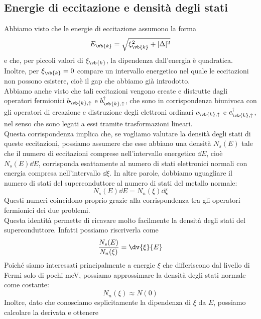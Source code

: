 \subsection{Energie di eccitazione e densità degli stati}
Abbiamo visto che le energie di eccitazione assumono la forma
\begin{equation*}
   E_{\vb{k}}
   =
   \sqrt{
      \xi_{\vb{k}}^2
      +
      |\Delta|^2
   }
\end{equation*}
e che, per piccoli valori di $\xi_{\vb{k}}$, la dipendenza dall'energia è quadratica. Inoltre, per $\xi_{\vb{k}}=0$ compare un intervallo energetico nel quale le eccitazioni non possono esistere, cioè il gap che abbiamo già introdotto.\\
Abbiamo anche visto che tali eccitazioni vengono create e distrutte dagli operatori fermionici $b_{\vb{k},\uparrow}$ e $b^{\dag}_{\vb{k},\uparrow}$, che sono in corrispondenza biunivoca con gli operatori di creazione e distruzione degli elettroni ordinari $c_{\vb{k},\uparrow}$ e $c^{\dag}_{\vb{k},\uparrow}$, nel senso che sono legati a essi tramite trasformazioni lineari.\\
Questa corrispondenza implica che, se vogliamo valutare la densità degli stati di queste eccitazioni, possiamo assumere che esse abbiano una densità $N_s(E)$ tale che il numero di eccitazioni comprese nell'intervallo energetico $\dd{E}$, cioè $N_s(E)\dd{E}$, corrisponda esattamente al numero di stati elettronici normali con energia compresa nell'intervallo $\dd{\xi}$. In altre parole, dobbiamo uguagliare il numero di stati del superconduttore al numero di stati del metallo normale:
\begin{equation*}
   N_s(E)\dd{E}=N_n(\xi)\dd{\xi}
\end{equation*}
Questi numeri coincidono proprio grazie alla corrispondenza tra gli operatori fermionici dei due problemi.\\
Questa identità permette di ricavare molto facilmente la densità degli stati del superconduttore. Infatti possiamo riscriverla come
\begin{equation*}
   \frac{ N_s(E) }{
      N_n(\xi)
   }
   =
   \dv{\xi}{E}
\end{equation*}
Poiché siamo interessati principalmente a energie $\xi$ che differiscono dal livello di Fermi solo di pochi meV, possiamo approssimare la densità degli stati normale come costante:
\begin{equation*}
   N_n(\xi)\approx N(0)
\end{equation*}
Inoltre, dato che conosciamo esplicitamente la dipendenza di $\xi$ da $E$, possiamo calcolare la derivata e ottenere
